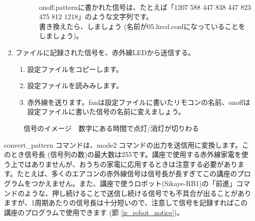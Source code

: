 \begin{enumerate}
\begin{enumerate}[1]
\begin{enumerate}[(1)]
\\onoff.patternに書かれた信号は、たとえば「1207 588 447 838 447 823 475 812 1218」のような文字列です。\\書き換えたら、しましょう (名前が05.lircd.confになっていることをしましょう)。
  \end{enumerate}
 \end{enumerate}
\item ファイルに記録された信号を、赤外線LEDから送信する。
 \begin{enumerate}[1]
  \item 設定ファイルをコピーします。 \\ 
  \item 設定ファイルを読みみします。\\ 
  \item 赤外線を送ります。fanは設定ファイルに書いたリモコンの名前、onoffは設定ファイルに書いた信号の名前に変えましょう。\\  
 \end{enumerate}
\end{enumerate}

\begin{figure}[H]
    \centering
 
    \caption{信号のイメージ　数字にある時間で点灯/消灯が切りわる}
\end{figure}

convert\_pattern コマンドは、mode2 コマンドの出力を送信用に変換します。このとき信号長 (信号列の数)の最大数は255です。講座で使用する赤外線家電を使う上ではありませんが、おうちの家電に応用するときは注意する必要があります。たとえば、多くのエアコンの赤外線信号は信号長が長すぎてこの講座のプログラムをつかえません。また、講座で使うロボット(Sikaye-RB1)の「前進」コマンドのような、押し続けることで送信し続ける信号でも不具合が出ることがありますが、1周期あたりの信号長は十分短いので、注意して信号を記録すればこの講座のプログラムで使用できます (節 \ref{ir_robot_notice})。\\

\begin{tcolorbox}[title=\useOmetoi]
    \begin{enumerate}
    \end{enumerate}
    \end{tcolorbox}
